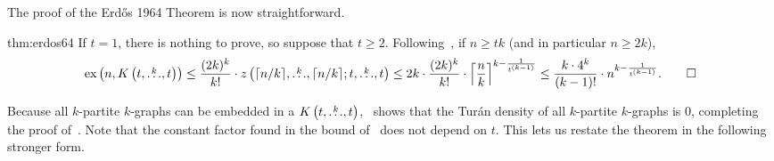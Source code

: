 The proof of the Erdős 1964 Theorem is now straightforward.

\begin{delayedproof}{thm:erdos64}
    If $t=1$, there is nothing to prove,
    so suppose that $t \geq 2$.
    Following~, if $n \geq tk$
    (and in particular $n \geq 2k$),
    \[
        \text{ex} \left( n, K\left(t, \overset{k}{\dots}, t\right) \right)
        \leq \frac{(2k)^k}{k!} \cdot z\left(\lceil n / k \rceil, \overset{k}{\dots}, \lceil n / k \rceil; t, \overset{k}{\dots}, t\right)
        \leq 2k \cdot \frac{(2k)^k}{k!} \cdot \left\lceil \frac{n}{k} \right\rceil^{k - \frac{1}{t^{(k-1)}}}
        \leq \frac{k \cdot 4^k}{(k-1)!} \cdot n^{k - \frac{1}{t^{(k-1)}}}. \qedhere
    \]
\end{delayedproof}

Because all $k$-partite $k$-graphs can be embedded in a $K\left(t, \overset{k}{\dots}, t\right)$,~
shows that the Turán density of all $k$-partite $k$-graphs is $0$,
completing the proof of~.
Note that the constant factor found in the bound of~
does not depend on $t$.
This lets us restate the theorem in the following stronger form.

